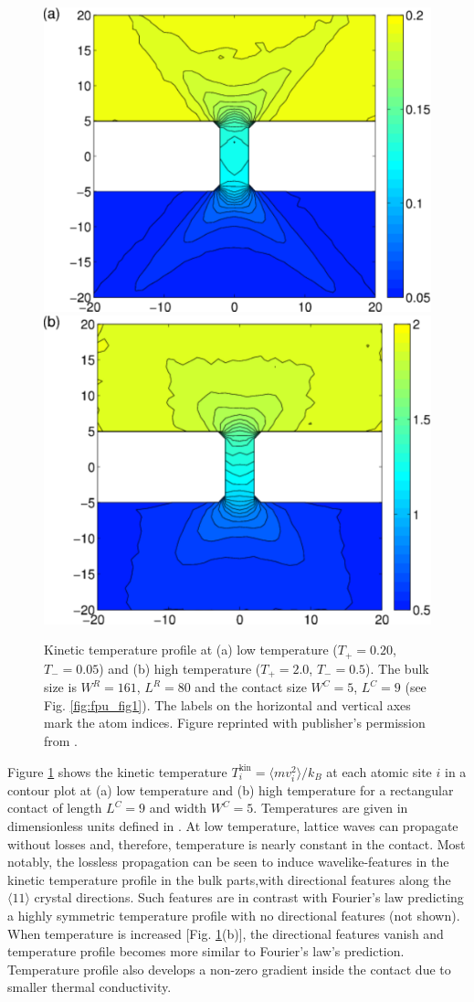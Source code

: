 \begin{figure}
\begin{center}
 \includegraphics[width=.49\columnwidth]{pics/fpu_fig2a.pdf}
  \includegraphics[width=.49\columnwidth]{pics/fpu_fig2b.pdf}
 \caption{Kinetic temperature profile at (a) low temperature ($T_+=0.20$, $T_-=0.05$) and (b) high temperature ($T_+=2.0$, $T_-=0.5$). The bulk size is $W^R=161$, $L^R=80$ and the contact size $W^C=5$, $L^C=9$ (see Fig. \ref{fig:fpu_fig1}). The labels on the horizontal and vertical axes mark the atom indices. Figure reprinted with publisher's permission from .}
\label{fig:fpu_fig2}
\end{center}
\end{figure}

Figure \ref{fig:fpu_fig2} shows the kinetic temperature $T_i^{\textrm{kin}}=\langle mv_i^2 \rangle/k_B$ at each atomic site $i$ in a contour plot at (a) low temperature and (b) high temperature for a rectangular contact of length $L^C=9$ and width $W^C=5$. Temperatures are given in dimensionless units defined in . At low temperature, lattice waves can propagate without losses and, therefore, temperature is nearly constant in the contact. Most notably, the lossless propagation can be seen to induce wavelike-features in the kinetic temperature profile in the bulk parts,with directional features along the $\langle 11 \rangle$ crystal directions. Such features are in contrast with Fourier's law predicting a highly symmetric temperature profile with no directional features (not shown). When temperature is increased [Fig. \ref{fig:fpu_fig2}(b)], the directional features vanish and temperature profile becomes more similar to Fourier's law's prediction. Temperature profile also develops a non-zero gradient inside the contact due to smaller thermal conductivity.


